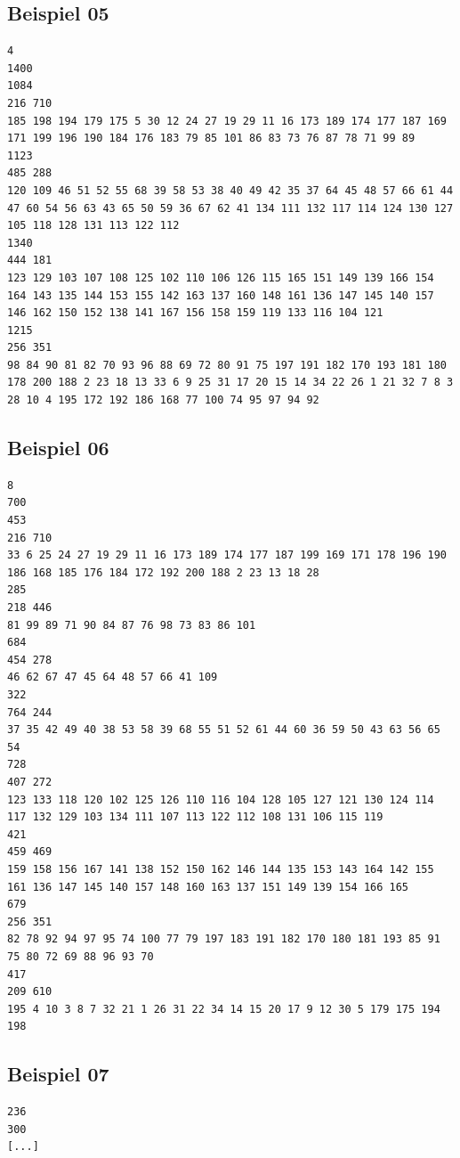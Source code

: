 \documentclass[a4paper,10pt,ngerman]{scrartcl}
\begin{document}
    \subsection{Beispiel 05}
    \begin{lstlisting}[style=plain]
4
1400
1084
216 710
185 198 194 179 175 5 30 12 24 27 19 29 11 16 173 189 174 177 187 169 171 199 196 190 184 176 183 79 85 101 86 83 73 76 87 78 71 99 89
1123
485 288
120 109 46 51 52 55 68 39 58 53 38 40 49 42 35 37 64 45 48 57 66 61 44 47 60 54 56 63 43 65 50 59 36 67 62 41 134 111 132 117 114 124 130 127 105 118 128 131 113 122 112
1340
444 181
123 129 103 107 108 125 102 110 106 126 115 165 151 149 139 166 154 164 143 135 144 153 155 142 163 137 160 148 161 136 147 145 140 157 146 162 150 152 138 141 167 156 158 159 119 133 116 104 121
1215
256 351
98 84 90 81 82 70 93 96 88 69 72 80 91 75 197 191 182 170 193 181 180 178 200 188 2 23 18 13 33 6 9 25 31 17 20 15 14 34 22 26 1 21 32 7 8 3 28 10 4 195 172 192 186 168 77 100 74 95 97 94 92
    \end{lstlisting}

    \subsection{Beispiel 06}
    \begin{lstlisting}[style=plain]
8
700
453
216 710
33 6 25 24 27 19 29 11 16 173 189 174 177 187 199 169 171 178 196 190 186 168 185 176 184 172 192 200 188 2 23 13 18 28
285
218 446
81 99 89 71 90 84 87 76 98 73 83 86 101
684
454 278
46 62 67 47 45 64 48 57 66 41 109
322
764 244
37 35 42 49 40 38 53 58 39 68 55 51 52 61 44 60 36 59 50 43 63 56 65 54
728
407 272
123 133 118 120 102 125 126 110 116 104 128 105 127 121 130 124 114 117 132 129 103 134 111 107 113 122 112 108 131 106 115 119
421
459 469
159 158 156 167 141 138 152 150 162 146 144 135 153 143 164 142 155 161 136 147 145 140 157 148 160 163 137 151 149 139 154 166 165
679
256 351
82 78 92 94 97 95 74 100 77 79 197 183 191 182 170 180 181 193 85 91 75 80 72 69 88 96 93 70
417
209 610
195 4 10 3 8 7 32 21 1 26 31 22 34 14 15 20 17 9 12 30 5 179 175 194 198
    \end{lstlisting}

    \subsection{Beispiel 07}
    \begin{lstlisting}[style=plain]
236
300
[...]
    \end{lstlisting}
\end{document}
